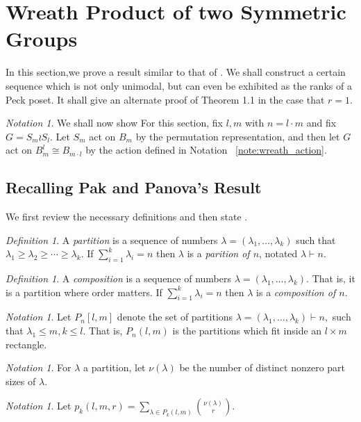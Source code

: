 \documentclass{amsart}
\theoremstyle{remark}
\newtheorem{defn}[thm]{Definition}
\newtheorem{note}[thm]{Notation}
\newcommand\ssec{\subsection}
\begin{document}
\section{Wreath Product of two Symmetric Groups}

In this section,we prove a result similar to that of \cite[Theorem 1.1]{pak}. We shall construct a certain sequence which is not only unimodal, but can even be exhibited as the ranks of a Peck poset. It shall give an alternate proof of Theorem 1.1 in the case that $r = 1.$

\begin{note}
We shall now show 
For this section, fix $l,m$ with $n = l \cdot m$ and fix $G = S_m \wr S_l.$ Let $S_m$ act on $B_m$ by the permutation representation, and then let $G$ act on $B_{m}^l\cong B_{m \cdot l}$ by the action defined in Notation ~\ref{note:wreath_action}.
\end{note}

\ssec{Recalling Pak and Panova's Result}
We first review the necessary definitions and then state \cite[Theorem 1.1]{pak}.

\begin{defn}
A {\it partition} is a sequence of numbers $\lambda = (\lambda_1,\ldots, \lambda_k)$ such that $\lambda_1 \geq \lambda_2 \geq \cdots \geq \lambda_k.$ If $\sum_{i=1}^k \lambda_i = n$ then $\lambda$ is a {\it parition of $n$}, notated $\lambda \vdash n.$
\end{defn}

\begin{defn}
A {\it composition} is a sequence of numbers $\lambda = (\lambda_1,\ldots, \lambda_k).$ That is, it is a partition where order matters. If $\sum_{i=1}^k \lambda_i = n$ then $\lambda$ is a {\it composition of $n$}.
\end{defn}

\begin{note}
Let $P_n[l,m]$ denote the set of partitions $\lambda = (\lambda_1,\ldots, \lambda_k) \vdash n,$ such that $\lambda_1 \leq m,k \leq l.$ That is, $P_n(l,m)$ is the partitions which fit inside an $l \times m$ rectangle.
\end{note}
\begin{note}
\cite[Section 1]{pak} For $\lambda$ a partition, let $\nu(\lambda)$ be the number of distinct nonzero part sizes of $\lambda.$
\end{note}

\begin{note}
\cite[Section 1]{pak}
Let $p_k(l,m,r) = \sum_{\lambda \in P_k(l,m)} \binom{\nu(\lambda)}{r}.$
\end{note}
\end{document}
